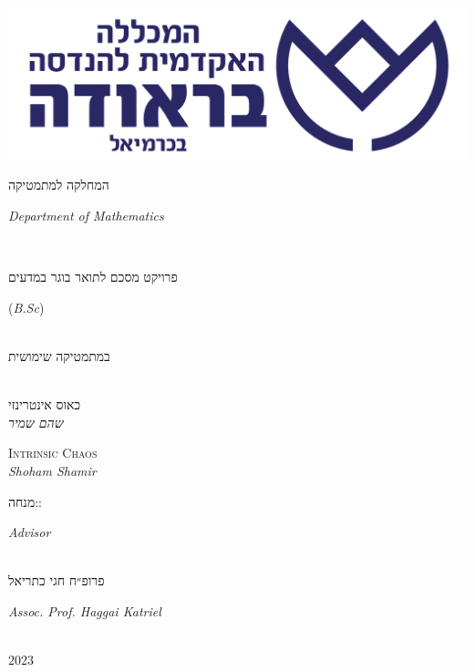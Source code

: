 \documentclass{article}
\begin{document}
\begin{center}
    \includegraphics[scale=0.15]{figs/braude.png}\\\smallskip
    \textcolor{braude}{המחלקה למתמטיקה\\\begin{otherlanguage}{English}\textit{Department of Mathematics}\end{otherlanguage}}\\\vspace{20mm}
    {\LARGE פרויקט מסכם לתואר בוגר במדעים \begin{otherlanguage}{English}(\textit{B.Sc})\end{otherlanguage}\\במתמטיקה שימושית}\\\vspace{20mm}
    {\fontsize{30}{36}\selectfont כאוס אינטרינזי}\\\medskip
    {\Large \textit{שהם שמיר}}\\\vspace{10mm}
    \begin{otherlanguage}{English}
        {\fontsize{30}{36}\selectfont\textsc{Intrinsic Chaos}}\\\medskip
        {\Large \textit{Shoham Shamir}}\\\vspace{35mm}
    \end{otherlanguage}
    מנחה:\hfill :\begin{otherlanguage}{English}\textit{Advisor}\end{otherlanguage}\\
    פרופ״ח חגי כתריאל\hfill\begin{otherlanguage}{English}\textit{Assoc. Prof. Haggai Katriel}\end{otherlanguage}\\\vfill
    \(2023\)
\end{center}
\thispagestyle{empty}
\newpage
\end{document}
